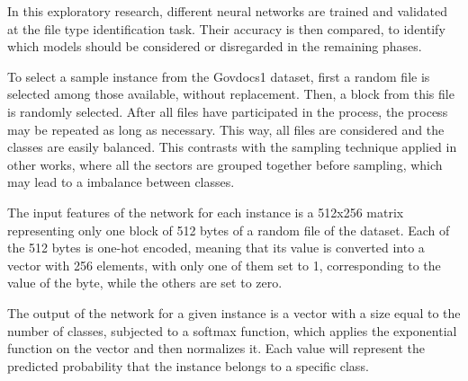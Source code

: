 \label{sec:evalmodels}

In this exploratory research, different neural networks are trained and validated
at the file type identification task. Their accuracy is then compared,
to identify which models should be considered or disregarded in the remaining phases.


To select a sample instance from the Govdocs1 dataset, first a random file is selected among those available, without replacement. Then, a block from this file is randomly selected. After all files have participated in the process, the process may be repeated as long as necessary. This way, all files are considered and the classes are easily balanced.
This contrasts with the sampling technique applied in other works, where all the sectors are grouped together before sampling, which may lead to a imbalance between classes.

The input features of the network for each instance is a 512x256 matrix representing only one block of 512 bytes of a random file of the dataset. Each of the 512 bytes is one-hot encoded, meaning that its value is converted into a vector with 256 elements, with only one of them set to 1, corresponding to the value of the byte, while the others are set to zero.


The output of the network for a given instance is a vector with a size equal to the number of classes, subjected to a softmax function, which applies the exponential function on the vector and then normalizes it. Each value will represent the predicted probability that the instance belongs to a specific class.


